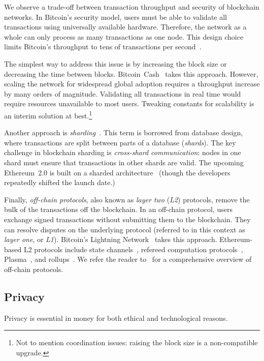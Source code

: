 We observe a trade-off between transaction throughput and security of blockchain networks.
In Bitcoin's security model, users must be able to validate all transactions using universally available hardware.
Therefore, the network as a whole can only process as many transactions as one node.
This design choice limits Bitcoin's throughput to tens of transactions per second~\cite{Croman2016}.

The simplest way to address this issue is by increasing the block size or decreasing the time between blocks.
Bitcoin~Cash~\cite{Kwon2019} takes this approach.
However, scaling the network for widespread global adoption requires a throughput increase by many orders of magnitude.
Validating all transactions in real time would require resources unavailable to most users.
Tweaking constants for scalability is an interim solution at best.\footnote{Not to mention coordination issues: raising the block size is a non-compatible upgrade.}

Another approach is \textit{sharding}~\cite{Gencer2016, Luu2016a}.
This term is borrowed from database design, where transactions are split between parts of a database (\textit{shards}).
The key challenge in blockchain sharding is \textit{cross-shard communication}: nodes in one shard must ensure that transactions in other shards are valid.
The upcoming Ethereum~2.0 is built on a sharded architecture~\cite{ShardingFAQ} (though the developers repeatedly shifted the launch date.)

Finally, \textit{off-chain protocols}, also known as \textit{layer two} (\textit{L2}) protocols, remove the bulk of the transactions off the blockchain.
In an off-chain protocol, users exchange signed transactions without submitting them to the blockchain.
They can resolve disputes on the underlying protocol (referred to in this context as \textit{layer one}, or \textit{L1}).
Bitcoin's Lightning Network~\cite{Poon2016} takes this approach.
Ethereum-based L2 protocols include state channels~\cite{Dziembowski2017, RaidenWebsite, Miller2019, }, refereed computation protocols~\cite{Teutsch2017, Kalodner2018}, Plasma~\cite{Poon2017}, and rollups~\cite{Floersch2019, Gluchowski2019}.
We refer the reader to~\cite{Gudgeon2019} for a comprehensive overview of off-chain protocols.


\subsection{Privacy}

Privacy is essential in money for both ethical and technological reasons.

